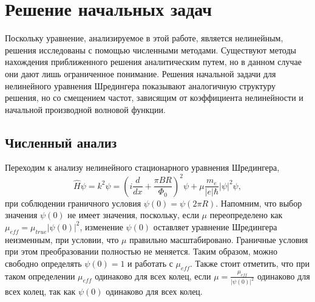 \documentclass[A4,12pt,oneside]{article}
\renewcommand{\(}{\left(}
\renewcommand{\)}{\right)}
\begin{document}
\section{Решение начальных задач}


Поскольку уравнение, анализируемое в этой работе, является нелинейным, решения исследованы с помощью численными методами. Существуют методы нахождения приближенного решения аналитическим путем, но в данном случае они дают лишь ограниченное понимание. Решения начальной задачи для нелинейного уравнения Шредингера показывают аналогичную структуру решения, но со смещением частот, зависящим от коэффициента нелинейности и начальной производной волновой функции.

\subsection{Численный анализ}

Переходим к анализу нелинейного стационарного уравнения Шредингера,
\begin{equation}\label{eqn:schrod}
\hat{H} \psi = k^2 \psi = \left( i \frac{d}{dx} + \frac{\pi BR}{\Phi_0} \right)^2 \psi + \mu \frac{m_e}{\left|e\right|\hbar} \left|\psi\right|^2 \psi,
\end{equation}
при соблюдении граничного условия $\psi\left(0\right) = \psi\left(2 \pi R\right)$. Напомним, что выбор значения $\psi\left(0\right)$ не имеет значения, поскольку, если $\mu$ переопределено как $\mu_{eff} = \mu_{true}\left|\psi\left(0\right)\right|^2$, изменение $\psi\left(0\right)$ оставляет уравнение Шредингера неизменным, при условии, что $\mu$ правильно масштабировано. Граничные условия при этом преобразовании полностью не меняется. Таким образом, можно свободно определять $\psi\left(0\right) = 1$ и работать с $\mu_{eff}$. Также стоит отметить, что при таком определении $\mu_{eff}$ одинаково для всех колец, если $\mu=\frac{\mu_{eff}}{\left|\psi\left(0\right)\right|^2}$ одинаково для всех колец, так как $\psi\left(0\right)$ одинаково для всех колец.
\end{document}
